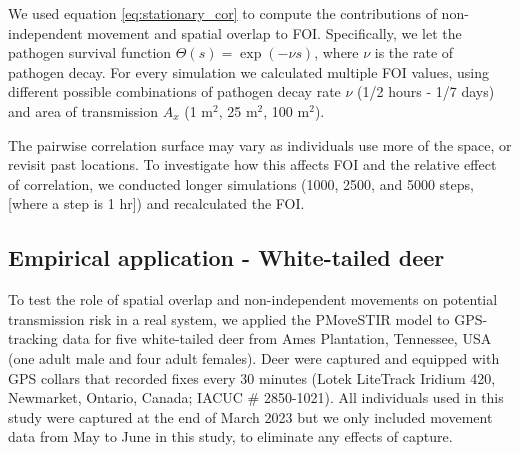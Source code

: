 \documentclass[letterpaper]{article}
\begin{document}
We used equation \ref{eq:stationary_cor} to compute the contributions of non-independent movement and spatial overlap to FOI.  Specifically, we let the pathogen survival function $\Theta(s) = \exp(-\nu s)$, where $\nu$ is the rate of pathogen decay. For every simulation we calculated multiple FOI values, using different possible combinations of pathogen decay rate $\nu$ (1/2 hours - 1/7 days) and area of transmission $A_x$ (1 m$^2$, 25 m$^2$, 100 m$^2$). %

The pairwise correlation surface may vary as individuals use more of the space, or revisit past locations. To investigate how this affects FOI and the relative effect of correlation, we conducted longer simulations (1000, 2500, and 5000 steps, [where a step is 1 hr]) and recalculated the FOI. 

\subsection*{Empirical application - White-tailed deer}

To test the role of spatial overlap and non-independent movements on potential transmission risk in a real system, we applied the PMoveSTIR model to GPS-tracking data for five white-tailed deer from Ames Plantation, Tennessee, USA (one adult male and four adult females). 
Deer were captured and equipped with GPS collars that recorded fixes every 30 minutes (Lotek LiteTrack Iridium 420, Newmarket, Ontario, Canada; IACUC \# 2850-1021).  All individuals used in this study were captured at the end of March 2023 but we only included movement data from May to June in this study, to eliminate any effects of capture. 
\end{document}
